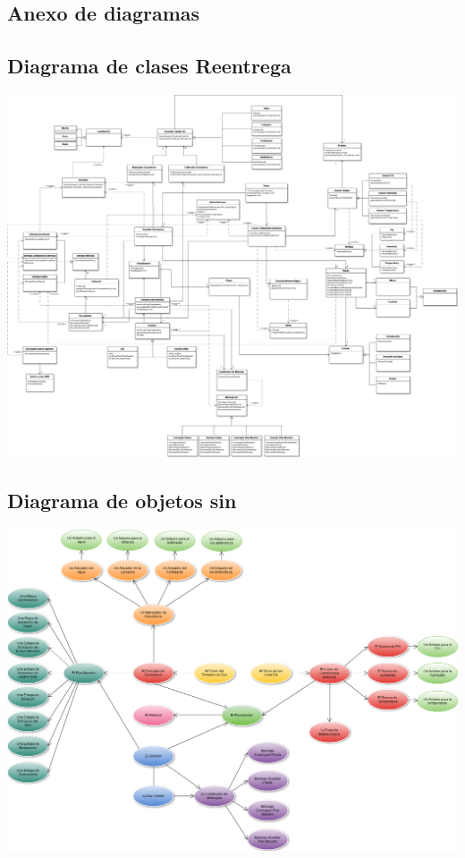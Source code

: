 \begin{landscape}
\section{Anexo de diagramas}
    \subsection{Diagrama de clases Reentrega}
        \includegraphics[width=1.1\textwidth]{img/clases.png}
    \newpage

    \subsection{Diagrama de objetos sin \historial{}}
        \includegraphics[width=1.2\textwidth]{img/objetosGeneral.png}
    \newpage


\end{landscape}
